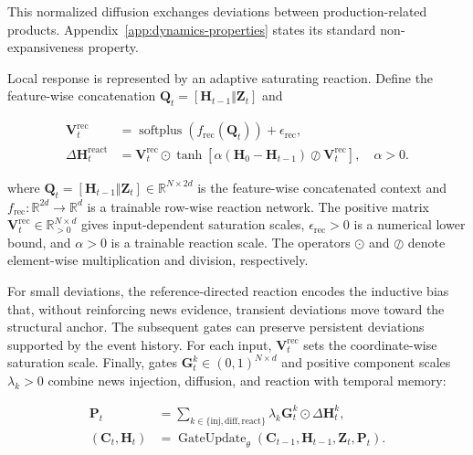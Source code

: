 \documentclass[letterpaper]{article} %
\begin{document}
This normalized diffusion exchanges deviations between production-related products. Appendix~\ref{app:dynamics-properties} states its standard non-expansiveness property.

Local response is represented by an adaptive saturating reaction. Define the feature-wise concatenation \(\mathbf Q_t=[\mathbf H_{t-1}\Vert\mathbf Z_t]\) and

\begin{equation}
\begin{aligned}
\mathbf V_t^{\mathrm{rec}}
&=\operatorname{softplus}(f_{\mathrm{rec}}(\mathbf Q_t))+\epsilon_{\mathrm{rec}},\\
\Delta\mathbf H_t^{\mathrm{react}}
&=\mathbf V_t^{\mathrm{rec}}\odot
\tanh\!\left[
\alpha(\mathbf H_0-\mathbf H_{t-1})
\oslash\mathbf V_t^{\mathrm{rec}}
\right],\quad \alpha>0.
\end{aligned}
\label{eq:reaction}
\end{equation}

where \(\mathbf Q_t=[\mathbf H_{t-1}\Vert\mathbf Z_t]\in\mathbb R^{N\times2d}\) is the feature-wise concatenated context and \(f_{\mathrm{rec}}:\mathbb R^{2d}\rightarrow\mathbb R^d\) is a trainable row-wise reaction network. The positive matrix \(\mathbf V_t^{\mathrm{rec}}\in\mathbb R_{>0}^{N\times d}\) gives input-dependent saturation scales, \(\epsilon_{\mathrm{rec}}>0\) is a numerical lower bound, and \(\alpha>0\) is a trainable reaction scale. The operators \(\odot\) and \(\oslash\) denote element-wise multiplication and division, respectively.

For small deviations, the reference-directed reaction encodes the inductive bias that, without reinforcing news evidence, transient deviations move toward the structural anchor. The subsequent gates can preserve persistent deviations supported by the event history. For each input, \(\mathbf V_t^{\mathrm{rec}}\) sets the coordinate-wise saturation scale. Finally, gates \(\mathbf G_t^k\in(0,1)^{N\times d}\) and positive component scales \(\lambda_k>0\) combine news injection, diffusion, and reaction with temporal memory:

\begin{equation}
\begin{aligned}
\mathbf P_t
&=\sum_{k\in\{\mathrm{inj},\mathrm{diff},\mathrm{react}\}}
\lambda_k\mathbf G_t^k\odot\Delta\mathbf H_t^k,\\
(\mathbf C_t,\mathbf H_t)
&=\operatorname{GateUpdate}_{\theta}
(\mathbf C_{t-1},\mathbf H_{t-1},\mathbf Z_t,\mathbf P_t).
\end{aligned}
\label{eq:gated-update}
\end{equation}
\end{document}
